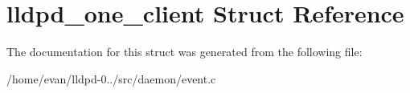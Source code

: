 \section{lldpd\-\_\-one\-\_\-client \-Struct \-Reference}
\label{structlldpd__one__client}


\-The documentation for this struct was generated from the following file\-:\begin{DoxyCompactItemize}
\item 
/home/evan/lldpd-\/0../src/daemon/event.\-c\end{DoxyCompactItemize}
